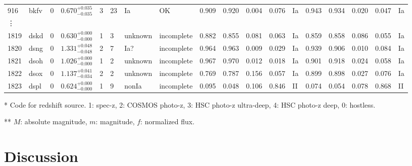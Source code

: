 \documentclass[useamsfonts]{pasj01}
\begin{document}
\begin{table}[ht]
{\begin{tabular}{p{1.5em}p{1em}p{1em}p{4.0em}p{2.1em}|p{0.6em}p{3.0em}p{4.5em}|p{2.9em}|p{1.3em}p{1.3em}p{1.3em}p{1em}|p{2.9em}|p{1.3em}p{1.3em}p{1.3em}p{1em}}
916  &  bkfv &     0 &    $0.670_{-0.035}^{+0.035}$ &         3 &   23 &     Ia &     OK &    0.909 &    0.920 &    0.004 &    0.076 &      Ia &    0.943 &    0.934 &    0.020 &    0.047 &      Ia \\
\vdots & & & & & & & & & & & & & & & & &\\
1819 &  dskd &     0 &    $0.630_{-0.000}^{+0.000}$ &         1 &    3 &  unknown &   incomplete &    0.882 &    0.855 &    0.081 &    0.063 &      Ia &    0.859 &    0.858 &    0.086 &    0.055 &      Ia \\
1820 &  dsng &     0 &    $1.331_{-0.048}^{+0.048}$ &         2 &    7 &    Ia? &   incomplete &    0.964 &    0.963 &    0.009 &    0.029 &      Ia &    0.939 &    0.906 &    0.010 &    0.084 &      Ia \\
1821 &  dsoh &     0 &    $1.026_{-0.000}^{+0.000}$ &         1 &    2 &  unknown &   incomplete &    0.967 &    0.970 &    0.012 &    0.018 &      Ia &    0.901 &    0.918 &    0.024 &    0.058 &      Ia \\
1822 &  dsox &     0 &    $1.137_{-0.034}^{+0.041}$ &         2 &    2 &  unknown &   incomplete &    0.769 &    0.787 &    0.156 &    0.057 &      Ia &    0.899 &    0.898 &    0.027 &    0.076 &      Ia \\
1823 &  dspl &     0 &    $0.624_{-0.000}^{+0.000}$ &         1 &    9 &  nonIa &   incomplete &    0.095 &    0.048 &    0.106 &    0.846 &      II &    0.074 &    0.054 &    0.078 &    0.868 &      II \\
\hline
\end{tabular}
}\label{tab:h_results}
\begin{tabnote}
* Code for redshift source.
1: spec-z, 2: COSMOS photo-z, 3: HSC photo-z ultra-deep, 4: HSC photo-z deep, 0: hostless.

** $M$: absolute magnitude, $m$: magnitude, $f$: normalized flux.
\end{tabnote}
\end{table}

\section{Discussion}
%
\end{document}
